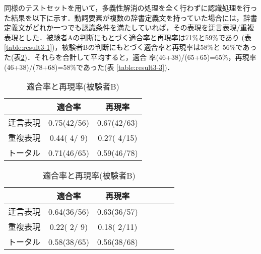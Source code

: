 \documentclass{nlp}
\begin{document}
同様のテストセットを用いて，多義性解消の処理を全く行わずに認識処理を行っ
た結果を以下に示す．動詞要素が複数の辞書定義文を持っていた場合には，辞書
定義文がどれか一つでも認識条件を満たしていれば，その表現を迂言表現/重複
表現とした．被験者Aの判断にもとづく適合率と再現率は71\%と59\%であり
(表\ref{table:result3-1})，被験者Bの判断にもとづく適合率と再現率は58\%と
56\%であった(表\ref{table:result3-2})．それらを合計して平均すると，適合
率(46+38)/(65+65)=65\%，再現率(46+38)/(78+68)=58\%であった(表
\ref{table:result3-3})．

\begin{table}[h]
 \begin{center}
  
  
  \begin{minipage}{60mm}
   \begin{center}
   \caption{適合率と再現率(被験者A)}
  \label{table:result3-1}
  \begin{tabular}{c|cc}\hline
            & 適合率            & 再現率       \\ \hline
   迂言表現 & 0.75(42/56)       & 0.67(42/63)  \\ \hline
   重複表現 & 0.44( 4/ 9)       & 0.27( 4/15)  \\ \hline
   トータル & 0.71(46/65)       & 0.59(46/78)  \\ \hline
  \end{tabular}
   \end{center}
  \end{minipage}
  
  \hspace{1mm}
  
  \begin{minipage}{60mm}
   \begin{center}
   \caption{適合率と再現率(被験者B)}
  \label{table:result3-2}
  \begin{tabular}{c|cccc|cc}\cline{1-3} \hline
            & 適合率            & 再現率            \\ \hline
   迂言表現 & 0.64(36/56)       & 0.63(36/57)       \\ \hline
   重複表現 & 0.22( 2/ 9)       & 0.18( 2/11)       \\ \hline
   トータル & 0.58(38/65)       & 0.56(38/68)       \\ \hline
  \end{tabular}
   \end{center}
   
   \end{minipage}
 \end{center}
\end{table}
\end{document}
